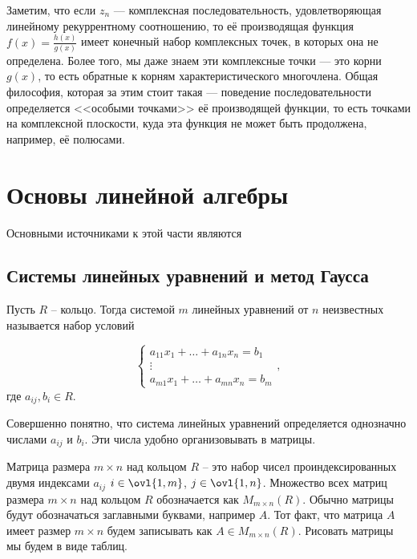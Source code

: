 Заметим, что если $z_n$ --- комплексная последовательность, удовлетворяющая линейному рекуррентному соотношению, то её производящая функция $f(x)=\frac{h(x)}{g(x)}$ имеет конечный набор комплексных точек, в которых она не определена. Более того, мы даже знаем эти комплексные точки --- это корни $g(x)$, то есть обратные к корням характеристического многочлена. Общая философия, которая за этим стоит такая --- поведение последовательности определяется  <<особыми точками>> её производящей функции, то есть точками на комплексной плоскости, куда эта  функция не может быть продолжена, например, её полюсами.




\chapter{Основы линейной алгебры}

Основными источниками к этой части являются \cite{Meyer}



\setcounter{zad}{0}
\setcounter{lem}{0}
\setcounter{thm}{0}
\setcounter{cor}{0}




\section{Системы линейных уравнений и метод Гаусса}

\dfn Пусть $R$ -- кольцо. Тогда системой $m$ линейных уравнений от $n$ неизвестных называется набор условий

$$\begin{cases}
a_{11}x_1+\dots + a_{1n}x_n=b_1\\
\vdots \\
a_{m1}x_1+\dots+a_{mn}x_n=b_m
\end{cases},$$
где $a_{ij}, b_i \in R$.
\edfn

Совершенно понятно, что система линейных уравнений определяется однозначно числами $a_{ij}$ и $b_i$. Эти числа удобно организовывать в матрицы.

\dfn Матрица размера $m\times n$ над кольцом $R$ -- это набор чисел проиндексированных двумя индексами $a_{ij}$ $i\in \ovl{1,m}$, $j\in \ovl{1,n}$. Множество всех матриц размера $m\times n$ над кольцом $R$ обозначается как $M_{m\times n}(R)$. Обычно матрицы  будут обозначаться заглавными буквами, например $A$. Тот факт, что матрица $A$ имеет размер $m\times n$ будем записывать как $A\in M_{m\times n}(R)$. Рисовать матрицы мы будем в виде таблиц.
\edfn

